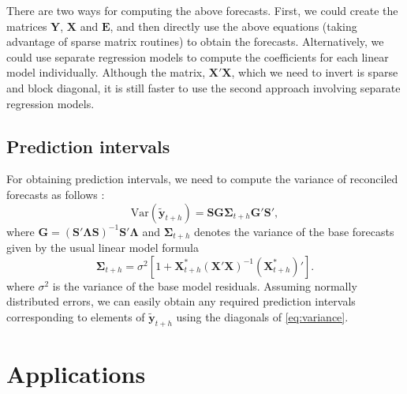 \documentclass[11pt,a4paper,]{article}
\begin{document}
There are two ways for computing the above forecasts. First, we could create the matrices \(\bm{Y}\), \(\bm{X}\) and \(\bm{E}\), and then directly use the above equations (taking advantage of sparse matrix routines) to obtain the forecasts. Alternatively, we could use separate regression models to compute the coefficients for each linear model individually. Although the matrix, \(\bm{X}'\bm{X}\), which we need to invert is sparse and block diagonal, it is still faster to use the second approach involving separate regression models.

\hypertarget{prediction-intervals}{%
\subsection{Prediction intervals}\label{prediction-intervals}}

For obtaining prediction intervals, we need to compute the variance of reconciled forecasts as follows \autocite{mint2018}:
\begin{equation}\label{eq:variance}
    \text{Var}(\tilde{\bm{y}}_{t+h})
        = \bm{S}\bm{G}{\bm{\Sigma}_{t+h}} \bm{G}'\bm{S}',
\end{equation}
where \(\bm{G} = (\bm{S}'\bm{\Lambda}\bm{S})^{-1}\bm{S}'\bm{\Lambda}\) and \({\bm{\Sigma}_{t+h}}\) denotes the variance of the base forecasts given by the usual linear model formula \autocite{fpp2}
\begin{equation}\label{eq:recvariance}
  \bm{\Sigma}_{t+h} = \sigma^2\left[1 + \bm{X}_{t+h}^*(\bm{X}'\bm{X})^{-1}(\bm{X}_{t+h}^*)'\right].
\end{equation}
where \(\sigma^2\) is the variance of the base model residuals. Assuming normally distributed errors, we can easily obtain any required prediction intervals corresponding to elements of \(\tilde{\bm{y}}_{t+h}\) using the diagonals of \eqref{eq:variance}.

\hypertarget{applications}{%
\section{Applications}\label{applications}}
\end{document}
